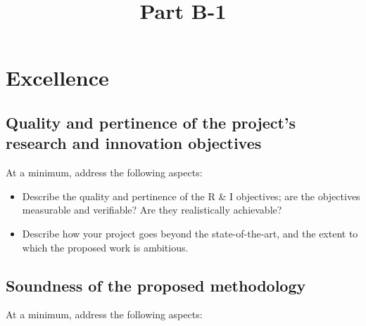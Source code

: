 \documentclass[11pt,draftproposal]{msca-pf}
\title{Part B-1}
\author{}
\date{}
\begin{document}
\maketitle

\section{Excellence}

\subsection{Quality and pertinence of the project's research and innovation objectives}

At a minimum, address the following aspects:

\begin{itemize}
    \item Describe the quality and pertinence of the R \& I objectives; are the
    objectives measurable and verifiable? Are they realistically achievable?

    \item Describe how your project goes beyond the state-of-the-art, and the
    extent to which the proposed work is ambitious.
\end{itemize}

\subsection{Soundness of the proposed methodology}

At a minimum, address the following aspects:
\end{document}
